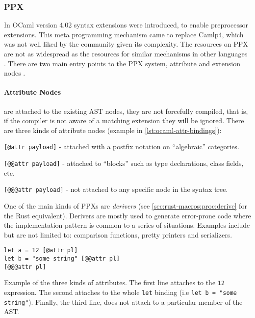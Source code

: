 \subsubsection*{PPX}\label{sec:lang-preprocessors:ocaml:ppx}

In OCaml version 4.02 syntax extensions were introduced, to enable preprocessor extensions.
This meta programming mechanism came to replace \gls{Camlp4}, which was not well liked by the community given its complexity.
The resources on \gls{PPX} are not as widespread as the resources for similar mechanisms in other languages .
There are two main entry points to the \gls{PPX} system, attribute and extension nodes \autocite[Chapter 8, Sections 12 \& 13]{Leroy2020}.

\paragraph{Attribute Nodes} are attached to the existing AST nodes,
they are not forcefully compiled, that is, if the compiler is not aware of a matching extension they will be ignored.
There are three kinds of attribute nodes (example in \autoref{lst:ocaml-attr-bindings}):
\begin{displayquote}
	\begin{compactitem}
		\item \texttt{[@attr payload]} - attached with a postfix notation on “algebraic” categories.
		\item \texttt{[@@attr payload]} - attached to “blocks” such as type declarations, class fields, etc.
		\item \texttt{[@@@attr payload]} - not attached to any specific node in the syntax tree.
	\end{compactitem}
\end{displayquote}

One of the main kinds of \gls{PPX}s are \emph{derivers} (see \autoref{sec:rust-macros:proc:derive} for the Rust equivalent).
Derivers are mostly used to generate error-prone code where the implementation pattern is common to a series of situations.
Examples include but are not limited to: comparison functions, pretty printers and serializers\footnotemark.

% 
\begin{listing}
	\begin{verbatim}
let a = 12 [@attr pl]
let b = "some string" [@@attr pl]
[@@@attr pl]
    \end{verbatim}
	\caption[Example of the three kinds of attributes.]{
		Example of the three kinds of attributes\footnotemark[\value{footnote}].
		The first line attaches to the \texttt{12} expression.
		The second attaches to the whole \texttt{let} binding (i.e \texttt{let b = "some string"}).
		Finally, the third line, does not attach to a particular member of the AST.
	}
	\label{lst:ocaml-attr-bindings}
\end{listing}


